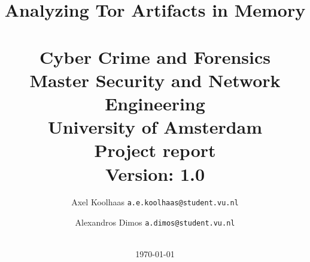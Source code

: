 \documentclass[a4paper,11pt]{article}
\begin{document}
\title{Analyzing Tor Artifacts in Memory \\~\\
\large{Cyber Crime and Forensics \\
Master Security and Network Engineering\\  University of Amsterdam\\
Project report\\}
\textbf{Version:} 1.0}
\author{
    Axel Koolhaas \texttt{a.e.koolhaas@student.vu.nl} \and
    Alexandros Dimos \texttt{a.dimos@student.vu.nl}\\
    \\
}
\date{
    \textnormal \today
}
\maketitle

\clearpage


\clearpage

\tableofcontents
\clearpage







\printbibliography

\end{document}
